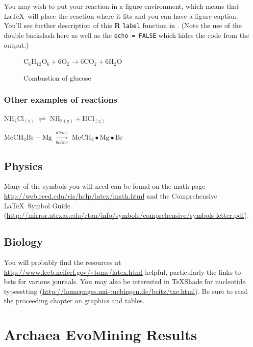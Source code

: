 \documentclass[12pt,twoside]{reedthesis}
\begin{document}
  You may wish to put your reaction in a figure environment, which means
  that \LaTeX~will place the reaction where it fits and you can have a
  figure caption. You'll see further description of this \textbf{R}
  \texttt{label} function in \protect\hyperlink{refux5flabels}{}. (Note
  the use of the double backslash here as well as the
  \texttt{echo\ =\ FALSE} which hides the code from the output.)
  
  \begin{figure}[h!tbp]
  \begin{center}
  $\mathrm{C_6H_{12}O_6  + 6O_2} \longrightarrow \mathrm{6CO_2 + 6H_2O}$
  \caption{Combustion of glucose}
  \label{fig:comb-gluc}
  \end{center}
  \end{figure}
  
  \subsection{Other examples of
  reactions}\label{other-examples-of-reactions}
  
  \(\mathrm{NH_4Cl_{(s)}}\) \(\rightleftharpoons\)
  \(\mathrm{NH_{3(g)}+HCl_{(g)}}\)
  
  \noindent \(\mathrm{MeCH_2Br + Mg}\) \(\xrightarrow[below]{above}\)
  \(\mathrm{MeCH_2\bullet Mg \bullet Br}\)
  
  \section{Physics}\label{physics}
  
  Many of the symbols you will need can be found on the math page
  \url{http://web.reed.edu/cis/help/latex/math.html} and the Comprehensive
  \LaTeX~Symbol Guide
  (\url{http://mirror.utexas.edu/ctan/info/symbols/comprehensive/symbols-letter.pdf}).
  
  \section{Biology}\label{biology}
  
  You will probably find the resources at
  \url{http://www.lecb.ncifcrf.gov/~toms/latex.html} helpful, particularly
  the links to bsts for various journals. You may also be interested in
  TeXShade for nucleotide typesetting
  (\url{http://homepages.uni-tuebingen.de/beitz/txe.html}). Be sure to
  read the proceeding chapter on graphics and tables.
  
  \hypertarget{refux5flabels}{\chapter{Archaea EvoMining
  Results}\label{refux5flabels}}
  
\end{document}
